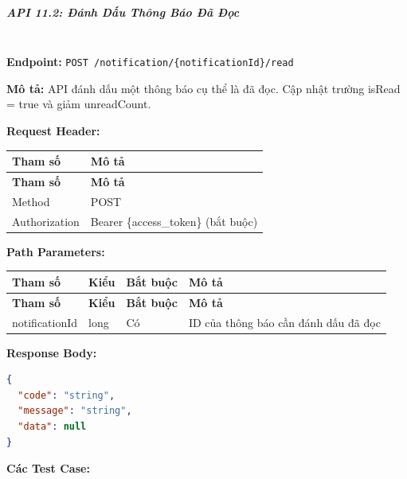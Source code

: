 \subparagraph{API 11.2: Đánh Dấu Thông Báo Đã Đọc}~\\

\textbf{Endpoint:} \texttt{POST /notification/\{notificationId\}/read}

\textbf{Mô tả:} API đánh dấu một thông báo cụ thể là đã đọc. Cập nhật trường isRead = true và giảm unreadCount.

\textbf{Request Header:}

\begin{longtable}{|p{}|p{}|}
\hline
\textbf{Tham số} & \textbf{Mô tả} \\
\hline
\endfirsthead

\hline
\textbf{Tham số} & \textbf{Mô tả} \\
\hline
\endhead

\hline
\endfoot

Method & POST \\
\hline
Authorization & Bearer \{access\_token\} (bắt buộc) \\
\hline
\end{longtable}

\textbf{Path Parameters:}

\begin{longtable}{|p{}|p{}|p{}|p{}|}
\hline
\textbf{Tham số} & \textbf{Kiểu} & \textbf{Bắt buộc} & \textbf{Mô tả} \\
\hline
\endfirsthead

\hline
\textbf{Tham số} & \textbf{Kiểu} & \textbf{Bắt buộc} & \textbf{Mô tả} \\
\hline
\endhead

\hline
\endfoot

notificationId & long & Có & ID của thông báo cần đánh dấu đã đọc \\
\hline
\end{longtable}

\textbf{Response Body:}

\begin{lstlisting}[language=json]
{
  "code": "string",
  "message": "string",
  "data": null
}
\end{lstlisting}

\textbf{Các Test Case:}

